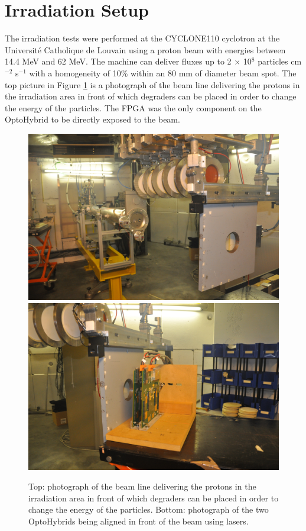   \section{Irradiation Setup}

    The irradiation tests were performed at the CYCLONE110 cyclotron at the Université Catholique de Louvain \cite{CYCLOTRON} using a proton beam with energies between 14.4 MeV and 62 MeV. The machine can deliver fluxes up to 2 $ \times $ 10$^8$ particles cm$^{-2}$ s$^{-1}$ with a homogeneity of 10\% within an 80 mm of diameter beam spot. The top picture in Figure \ref{fig:II-5-cyclotron} is a photograph of the beam line delivering the protons in the irradiation area in front of which degraders can be placed in order to change the energy of the particles. The FPGA was the only component on the OptoHybrid to be directly exposed to the beam. \\

    \begin{figure}[p!]
      \centering
      \includegraphics[width=\textwidth]{img/II-5-irradiation/cyclotron.jpg} \\
      \vspace*{0.4cm}
      \includegraphics[width=\textwidth]{img/II-5-irradiation/boards.jpg}
      \caption{Top: photograph of the beam line delivering the protons in the irradiation area in front of which degraders can be placed in order to change the energy of the particles. Bottom: photograph of the two OptoHybrids being aligned in front of the beam using lasers.}
      \label{fig:II-5-cyclotron}
    \end{figure}

